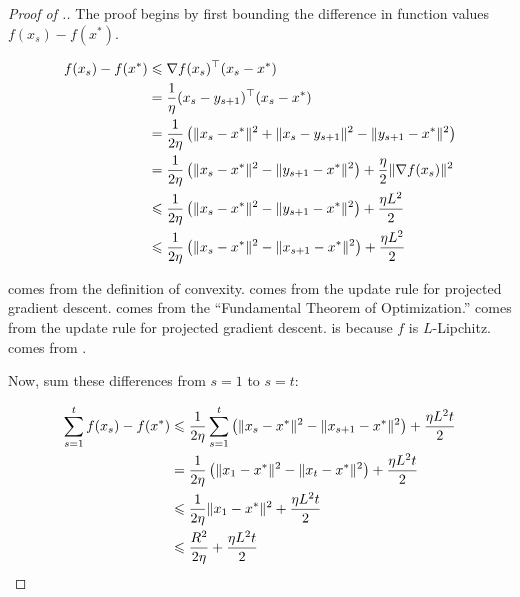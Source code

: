 \begin{proof}[Proof of .]

The proof begins by first bounding the difference in function values $f(x_s) -
f(x^*)$.

\begin{align}
    f(x_s) - f(x^*) &\leq \nabla f(x_s)^\trans (x_s - x^*) \equationlabel{a} \\
    &= \frac{1}{\eta}(x_s - y_{s+1})^\trans(x_s - x^*) \equationlabel{b} \\
    &= \frac{1}{2\eta} \left(\lVert x_s - x^* \rVert^2 + \lVert x_s - y_{s+1} \rVert^2 - \lVert y_{s+1} - x^* \rVert^2 \right) \equationlabel{c} \\
    &= \frac{1}{2\eta} \left(\lVert x_s - x^* \rVert^2 - \lVert y_{s+1} - x^* \rVert^2 \right) + \frac{\eta}{2} \lVert \nabla f(x_s) \rVert^2 \equationlabel{d} \\
    &\leq \frac{1}{2\eta} \left(\lVert x_s - x^* \rVert^2 - \lVert y_{s+1} - x^* \rVert^2 \right) + \frac{\eta L^2}{2} \equationlabel{e} \\
    &\leq \frac{1}{2\eta} \left(\lVert x_s - x^* \rVert^2 - \lVert x_{s+1} - x^* \rVert^2 \right) + \frac{\eta L^2}{2} \equationlabel{f}
\end{align}

 comes from the definition of convexity.  comes
from the update rule for projected gradient descent.  comes from
the ``Fundamental Theorem of Optimization.''  comes from the
update rule for projected gradient descent.  is because $f$ is
$L$-Lipchitz. 
comes from .

Now, sum these differences from $s=1$ to $s=t$:

\begin{align}
   \sum_{s=1}^t f(x_s) - f(x^*) &\leq  \frac{1}{2\eta} \sum_{s=1}^t \left(\lVert x_s - x^* \rVert^2 - \lVert x_{s+1} - x^* \rVert^2 \right) + \frac{\eta L^2 t}{2} \equationlabel{g} \\
   &= \frac{1}{2\eta} \left(\lVert x_1 - x^* \rVert^2 - \lVert x_{t} - x^{*} \rVert^2 \right) + \frac{\eta L^2 t}{2} \equationlabel{h} \\
   &\leq \frac{1}{2\eta} \lVert x_1 - x^* \rVert^2 + \frac{\eta L^2 t}{2} \equationlabel{i} \\
   &\leq \frac{R^2}{2\eta} + \frac{\eta L^2 t}{2} \equationlabel{j}
\end{align}


\end{proof}
